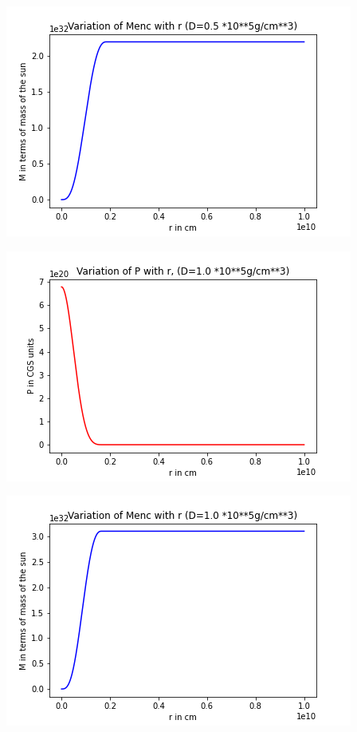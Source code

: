 \documentclass{article}
\begin{document}
\begin{center}
\begin{multicols}{2}
\begin{center}
        \end{center}
\columnbreak
       \includegraphics[scale=0.3]{Images/Mr_pb1_1}
\end{multicols}
\begin{multicols}{2}
	\begin{center}
        \includegraphics[scale=0.3]{Images/Pr_pb1_2}
        \end{center}
\columnbreak
       \includegraphics[scale=0.3]{Images/Mr_pb1_2}

\end{multicols}
\end{center}
\end{document}
